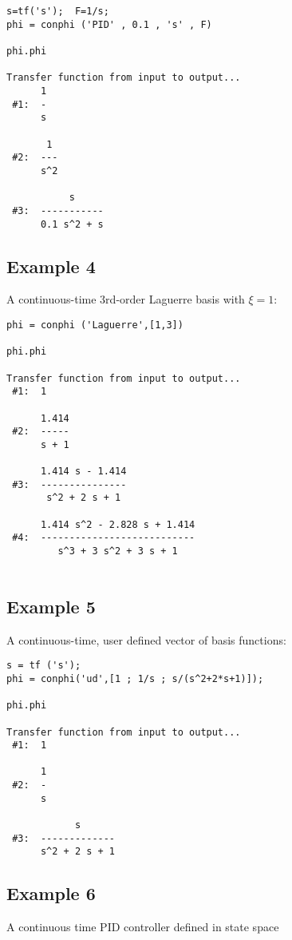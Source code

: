 \documentclass [12pt , a4paper] {report}
\begin{document}
\begin{lstlisting}
s=tf('s');  F=1/s;
phi = conphi ('PID' , 0.1 , 's' , F) 

phi.phi
 
Transfer function from input to output...
      1
 #1:  -
      s
 
       1
 #2:  ---
      s^2
 
           s
 #3:  -----------
      0.1 s^2 + s    

\end{lstlisting}

\subsection{Example 4} A continuous-time 3rd-order Laguerre basis with $\xi=1$:

\begin{lstlisting}
phi = conphi ('Laguerre',[1,3])

phi.phi
 
Transfer function from input to output...
 #1:  1
 
      1.414
 #2:  -----
      s + 1
 
      1.414 s - 1.414
 #3:  ---------------
       s^2 + 2 s + 1
 
      1.414 s^2 - 2.828 s + 1.414
 #4:  ---------------------------
         s^3 + 3 s^2 + 3 s + 1
         
\end{lstlisting}

\subsection{Example 5} A continuous-time, user defined vector of basis functions:

\begin{lstlisting}
s = tf ('s');
phi = conphi('ud',[1 ; 1/s ; s/(s^2+2*s+1)]);

phi.phi
 
Transfer function from input to output...
 #1:  1
 
      1
 #2:  -
      s
 
            s
 #3:  -------------
      s^2 + 2 s + 1
  \end{lstlisting}

  \subsection{Example 6} A continuous time PID controller defined in state space
\end{document}
